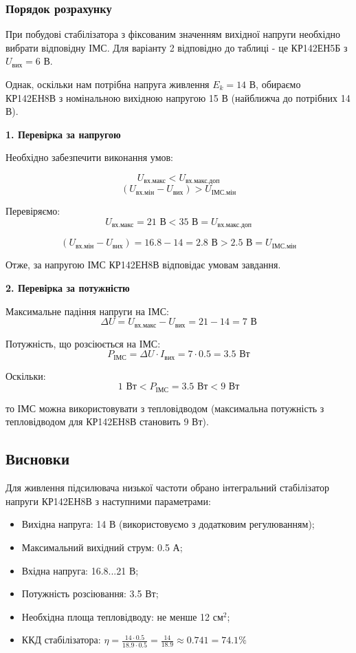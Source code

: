 \documentclass[main.tex]{subfiles}
\begin{document}
\subsubsection{Порядок розрахунку}

При побудові стабілізатора з фіксованим значенням вихідної напруги необхідно вибрати відповідну ІМС. Для варіанту 2 відповідно до таблиці - це КР142ЕН5Б з $U_{\text{вих}} = 6$ В.

Однак, оскільки нам потрібна напруга живлення $E_k = 14$ В, обираємо КР142ЕН8В з номінальною вихідною напругою 15 В (найближча до потрібних 14 В).

\textbf{1. Перевірка за напругою}

Необхідно забезпечити виконання умов:

\[
U_{\text{вх.макс}} < U_{\text{вх.макс.доп}}
\]
\[
(U_{\text{вх.мін}} - U_{\text{вих}}) > U_{\text{ІМС.мін}}
\]


Перевіряємо:
\[U_{\text{вх.макс}} = 21\text{ В} < 35\text{ В} = U_{\text{вх.макс.доп}}\]

\[(U_{\text{вх.мін}} - U_{\text{вих}}) = 16.8 - 14 = 2.8\text{ В} > 2.5\text{ В} = U_{\text{ІМС.мін}}\]

Отже, за напругою ІМС КР142ЕН8В відповідає умовам завдання.

\textbf{2. Перевірка за потужністю}

Максимальне падіння напруги на ІМС:
\[\Delta U = U_{\text{вх.макс}} - U_{\text{вих}} = 21 - 14 = 7\text{ В}\]

Потужність, що розсіюється на ІМС:
\[P_{\text{ІМС}} = \Delta U \cdot I_{\text{вих}} = 7 \cdot 0.5 = 3.5\text{ Вт}\]

Оскільки:
\[1\text{ Вт} < P_{\text{ІМС}} = 3.5\text{ Вт} < 9\text{ Вт}\]

то ІМС можна використовувати з тепловідводом (максимальна потужність з тепловідводом для КР142ЕН8В становить 9 Вт).

\subsection{Висновки}

Для живлення підсилювача низької частоти обрано інтегральний стабілізатор напруги КР142ЕН8В з наступними параметрами:
\begin{itemize}
    \item Вихідна напруга: 14 В (використовуємо з додатковим регулюванням);
    \item Максимальний вихідний струм: 0.5 А;
    \item Вхідна напруга: 16.8...21 В;
    \item Потужність розсіювання: 3.5 Вт;
    \item Необхідна площа тепловідводу: не менше 12 см$^2$;
    \item ККД стабілізатора: $\eta = \frac{14 \cdot 0.5}{18.9 \cdot 0.5} = \frac{14}{18.9} \approx 0.741 = 74.1\%$
\end{itemize}
\end{document}
